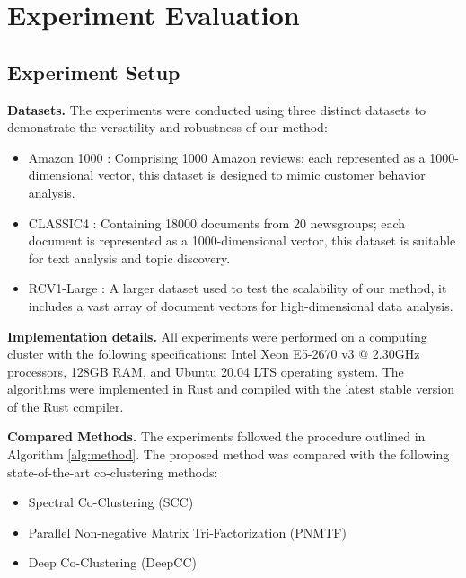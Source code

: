\section{Experiment Evaluation}
\label{sec:experiment}
\subsection{Experiment Setup}

\textbf{Datasets.}
The experiments were conducted using three distinct datasets to demonstrate the versatility and robustness of our method:

\begin{itemize}
    \item Amazon 1000 \cite{ni2019justifying}: Comprising 1000 Amazon reviews; each represented as a 1000-dimensional vector, this dataset is designed to mimic customer behavior analysis.
    \item CLASSIC4 \cite{reddy2021weclustering}: Containing 18000 documents from 20 newsgroups; each document is represented as a 1000-dimensional vector, this dataset is suitable for text analysis and topic discovery.
    \item RCV1-Large \cite{lewis2004rcv1}: A larger dataset used to test the scalability of our method, it includes a vast array of document vectors for high-dimensional data analysis.
\end{itemize}

\textbf{Implementation details.}
All experiments were performed on a computing cluster with the following specifications: Intel Xeon E5-2670 v3 @ 2.30GHz processors, 128GB RAM, and Ubuntu 20.04 LTS operating system. The algorithms were implemented in Rust and compiled with the latest stable version of the Rust compiler.

\textbf{Compared Methods.}
The experiments followed the procedure outlined in Algorithm \ref{alg:method}. The proposed method was compared with the following state-of-the-art co-clustering methods:

\begin{itemize}
    \item Spectral Co-Clustering (SCC) \cite{dhillon2001CoclusteringDocumentsWords}
    \item Parallel Non-negative Matrix Tri-Factorization (PNMTF)\cite{chen2023ParallelNonNegativeMatrix}
    \item Deep Co-Clustering (DeepCC) \cite{dongkuanxu2019DeepCoClustering}
\end{itemize}

